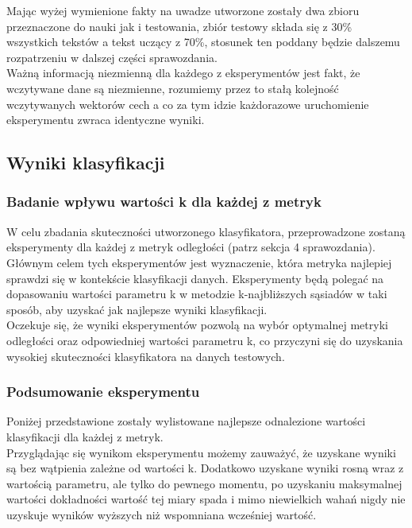 \documentclass{article}
\begin{document}
\noindent Mając wyżej wymienione fakty na uwadze utworzone zostały dwa zbioru przeznaczone do nauki jak i testowania, zbiór testowy składa się z 30\% wszystkich tekstów a tekst uczący z 70\%, stosunek ten poddany będzie dalszemu rozpatrzeniu w dalszej części sprawozdania. \\

\noindent Ważną informacją niezmienną dla każdego z eksperymentów jest fakt, że wczytywane dane są niezmienne, rozumiemy przez to stałą kolejność wczytywanych wektorów cech a co za tym idzie każdorazowe uruchomienie eksperymentu zwraca identyczne wyniki.

\subsection*{Wyniki klasyfikacji}

\subsubsection*{Badanie wpływu wartości k dla każdej z metryk}

W celu zbadania skuteczności utworzonego klasyfikatora, przeprowadzone zostaną eksperymenty dla każdej z metryk odległości (patrz sekcja 4 sprawozdania). Głównym celem tych eksperymentów jest wyznaczenie, która metryka najlepiej sprawdzi się w kontekście klasyfikacji danych. Eksperymenty będą polegać na dopasowaniu wartości parametru k w metodzie k-najbliższych sąsiadów w taki sposób, aby uzyskać jak najlepsze wyniki klasyfikacji. \\

\noindent Oczekuje się, że wyniki eksperymentów pozwolą na wybór optymalnej metryki odległości oraz odpowiedniej wartości parametru k, co przyczyni się do uzyskania wysokiej skuteczności klasyfikatora na danych testowych.






\subsubsection*{Podsumowanie eksperymentu}

\noindent Poniżej przedstawione zostały wylistowane najlepsze odnalezione wartości klasyfikacji dla każdej z metryk. \\



\noindent Przyglądając się wynikom eksperymentu możemy zauważyć, że uzyskane wyniki są bez wątpienia zależne od wartości k. Dodatkowo uzyskane wyniki rosną wraz z wartością parametru, ale tylko do pewnego momentu, po uzyskaniu maksymalnej wartości dokładności wartość tej miary spada i mimo niewielkich wahań nigdy nie uzyskuje wyników wyższych niż wspomniana wcześniej wartość. \\
\end{document}
